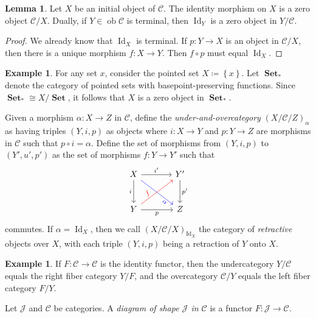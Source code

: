 \documentclass[10pt,letterpaper,cm]{nupset}
\theoremstyle{definition}
\newtheorem{exmp}[definition]{Example}
\theoremstyle{theorem}
\newtheorem{lemma}[definition]{Lemma}
\theoremstyle{remark}
\newcommand{\1}{\mathbf{1}}
\renewcommand{\c}{\mathscr{C}}
\renewcommand{\j}{\mathscr{J}}
\newcommand{\0}{\vec 0}
\DeclareMathOperator{\id}{Id}
\DeclareMathOperator{\ob}{ob}
\DeclareMathOperator{\set}{\mathbf{Set}}
\begin{document}
\begin{lemma}
Let $X$ be an initial object of $\c$. The identity morphism on $X$ is a zero object ${\c}/{X}$. Dually, if $Y \in \ob \c$ is terminal, then $\id_Y$ is a zero object in ${Y}/{\c}$.
\end{lemma}
\begin{proof}
We already know that $\id_X$ is terminal. If $p: Y \to X$ is an object in ${\c}/{X}$, then there is a unique morphism $f: X \to Y$. Then $f\circ p$ must equal $\id_X$.
\end{proof}

\begin{exmp}
For any set $x$, consider the pointed set  $X\coloneqq \left\{x\right\}$. Let $\set_{\ast}$ denote the category of pointed sets with basepoint-preserving functions. Since  $\set_{\ast} \cong {X}/{\set}$, it follows that $X$ is a zero object in $\set_{\ast}$.
\end{exmp}

\smallskip

Given a morphism $\alpha : X \to Z$ in $\c$, define the \textit{under-and-overcategory} $\left(X/\c/Z\right)_{\alpha}$ as having triples $\left(Y, i, p\right)$ as objects where $i : X \to Y$ and $p: Y \to Z$ are morphisms in $\c$ such that $p\circ i = \alpha$. Define the set of morphisms from $\left(Y, i, p\right)$ to $\left(Y', u', p'\right)$ as the set of morphisms $f: Y \to Y'$ such that 
\[
\begin{tikzcd}[row sep=large, column sep=large]
X \arrow[to=Z, "i ", swap] \arrow[to=2-2, dr, blue, sloped,pos=.8, "\alpha", swap]
& Y' \arrow[to=2-2, "p' "] \\
|[alias=Z]| Y \arrow[to=1-2, ur, red, sloped,pos=.3, "f"] \arrow[to=2-2, "p"'] 
& Z
\arrow[from=ul, to=1-2, "i' "]
\end{tikzcd}
\]
commutes. If $\alpha = \id_X$, then we call $\left(X/\c/X\right)_{\id_X}$ the category of \textit{retractive} objects over $X$, with each triple $\left(Y, i, p\right)$ being a retraction of $Y$ onto $X$.


\begin{exmp}
If $F: \c \to \c$ is the identity functor, then the undercategory $Y/\c$ equals the right fiber category $Y/F$, and the overcategory $\c/Y$ equals the left fiber category $F/Y$.
\end{exmp}

\medskip


Let $\j$ and $\c$ be categories. A \textit{diagram of shape $\j$ in $\c$} is a functor $F: \j \to \c$.
\end{document}
